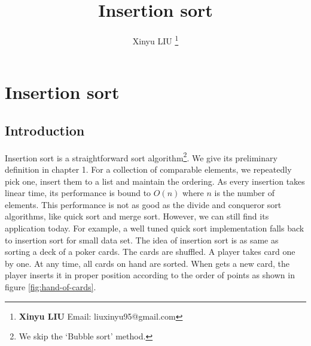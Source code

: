 \documentclass[b5paper]{article}
\begin{document}
\title{Insertion sort}

\author{Xinyu LIU
\thanks{{\bfseries Xinyu LIU} \newline
  Email: liuxinyu95@gmail.com \newline}
  }

\maketitle
\fi


\ifx\wholebook\relax
\chapter{Insertion sort}
\fi

\section{Introduction}
\label{sec:isort-introduction} 

Insertion sort is a straightforward sort algorithm\footnote{We skip the `Bubble sort' method\cite{wiki-bubble-sort}.}. We give its preliminary definition in chapter 1. For a collection of comparable elements, we repeatedly pick one, insert them to a list and maintain the ordering. As every insertion takes linear time, its performance is bound to $O(n)$ where $n$ is the number of elements. This performance is not as good as the divide and conqueror sort algorithms, like quick sort and merge sort. However, we can still find its application today. For example, a well tuned quick sort implementation falls back to insertion sort for small data set. The idea of insertion sort is as same as sorting a deck of a poker cards\cite{CLRS}. The cards are shuffled. A player takes card one by one. At any time, all cards on hand are sorted. When gets a new card, the player inserts it in proper position according to the order of points as shown in figure \ref{fig:hand-of-cards}.
\end{document}

